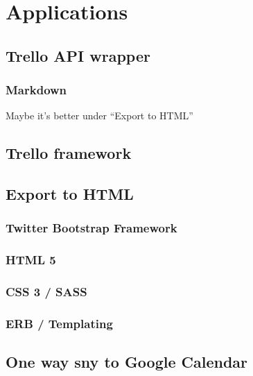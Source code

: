 
\chapter{Applications}
  \label{Applications}

\section{Trello API wrapper}

\subsection{Markdown}
Maybe it's better under \textquotedblleft Export to HTML\textquotedblright

\section{Trello framework}

\section{Export to HTML}

\subsection{Twitter Bootstrap Framework}

\subsection{HTML 5}

\subsection{CSS 3 / SASS}

\subsection{ERB / Templating}

\section{One way sny to Google Calendar}

